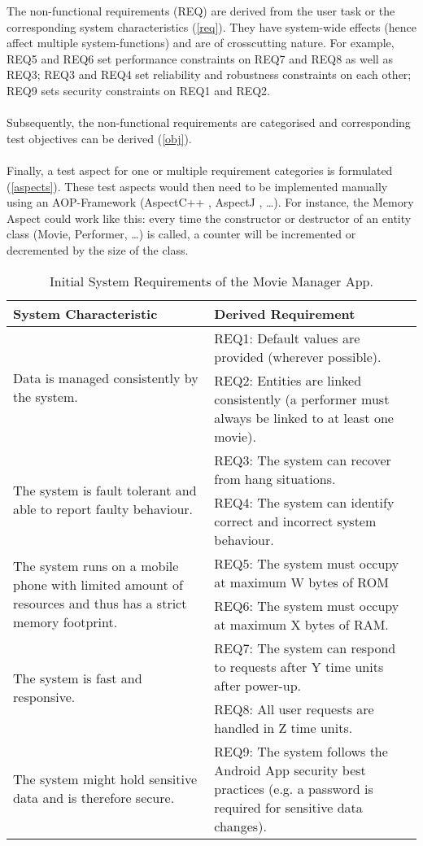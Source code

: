  The non-functional requirements (REQ) are derived from the user task or the corresponding system characteristics (\autoref{req}). They have system-wide effects (hence affect multiple system-functions) and are of crosscutting nature. For example, REQ5 and REQ6 set performance constraints on REQ7 and REQ8 as well as REQ3; REQ3 and REQ4 set reliability and robustness constraints on each other; REQ9 sets security constraints on REQ1 and REQ2.\\
\\
 Subsequently, the non-functional requirements are categorised and corresponding test objectives can be derived (\autoref{obj}).\\
\\
Finally, a test aspect for one or multiple requirement categories is formulated (\autoref{aspects}). These test aspects would then need to be implemented manually using an AOP-Framework (AspectC++ \cite{C++}, AspectJ \cite{J}, …). For instance, the Memory Aspect could work like this: every time the constructor or destructor of an entity class (Movie, Performer, …) is called, a counter will be incremented or decremented by the size of the class.

\begin{table}[tbh]
\begin{small}
\caption{Initial System Requirements of the Movie Manager App.}
\begin{tabular}{p{7cm}|p{7cm}}
\hline
\textbf{System Characteristic} & \textbf{Derived Requirement}\\
\hline
\multirow{2}{6.5cm}{Data is managed consistently by the system.} & REQ1: Default values are provided (wherever possible).\\
 & REQ2: Entities are linked consistently (a performer must always be linked to at least one movie).\\ 
\hline  
\multirow{2}{6.5cm}{The system is fault tolerant and able to report faulty behaviour.} & REQ3: The system can recover from hang situations.\\
 & REQ4: The system can identify correct and incorrect system behaviour.\\
\hline 
\multirow{2}{6.5cm}{The system runs on a mobile phone with limited amount of resources and thus has a strict memory footprint.} & REQ5: The system must occupy at maximum W bytes of ROM\\
 & REQ6: The system must occupy at maximum X bytes of RAM.\\
\hline 
\multirow{2}{6.5cm}{The system is fast and responsive.} & REQ7: The system can respond to requests after Y time units after power-up.\\
 & REQ8: All user requests are handled in Z time units.\\
\hline  
The system might hold sensitive data and is therefore secure. & REQ9: The system follows the Android App security best practices (e.g. a password is required for sensitive data changes).\\
\hline
\end{tabular}
\label{req}
\end{small}
\end{table}

